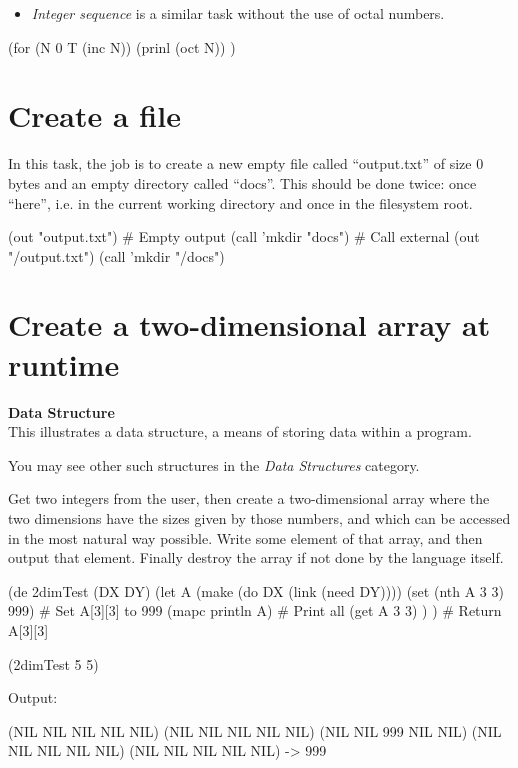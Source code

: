 \begin{itemize}
\item \emph{Integer sequence} is a similar task without the use of
  octal numbers.
\end{itemize}


\begin{wideverbatim}

(for (N 0  T  (inc N))
   (prinl (oct N)) )

\end{wideverbatim}

\pagebreak{}
\section*{Create a file}

In this task, the job is to create a new empty file called
``output.txt'' of size 0 bytes and an empty directory called ``docs''.
This should be done twice: once ``here'', i.e. in the current working
directory and once in the filesystem root.


\begin{wideverbatim}

(out "output.txt")                     # Empty output
(call 'mkdir "docs")                   # Call external
(out "/output.txt")
(call 'mkdir "/docs")

\end{wideverbatim}

\pagebreak{}
\section*{Create a two-dimensional array at runtime}


\textbf{Data Structure}\\ This illustrates a data structure, a means of
storing data within a program.

You may see other such structures in the \emph{Data Structures}
category.

Get two integers from the user, then create a two-dimensional array
where the two dimensions have the sizes given by those numbers, and
which can be accessed in the most natural way possible. Write some
element of that array, and then output that element. Finally destroy
the array if not done by the language itself.


\begin{wideverbatim}

(de 2dimTest (DX DY)
   (let A (make (do DX (link (need DY))))
      (set (nth A 3 3) 999)            # Set A[3][3] to 999
      (mapc println A)                 # Print all
      (get A 3 3) ) )                  # Return A[3][3]

(2dimTest 5 5)

Output:

(NIL NIL NIL NIL NIL)
(NIL NIL NIL NIL NIL)
(NIL NIL 999 NIL NIL)
(NIL NIL NIL NIL NIL)
(NIL NIL NIL NIL NIL)
-> 999

\end{wideverbatim}

